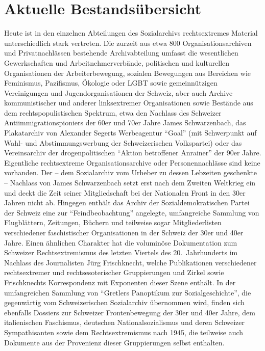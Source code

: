 \documentclass[a4paper,
fontsize=11pt,
oneside,
numbers=noperiodatend,
parskip=half-,
bibliography=totoc,
final
]{scrartcl}
\begin{document}
\hypertarget{aktuelle-bestandsuxfcbersicht}{%
\section*{Aktuelle
Bestandsübersicht}\label{aktuelle-bestandsuxfcbersicht}}

Heute ist in den einzelnen Abteilungen des Sozialarchivs rechtsextremes
Material unterschiedlich stark vertreten. Die zurzeit aus etwa 800
Organisationsarchiven und Privatnachlässen bestehende Archivabteilung
umfasst die wesentlichen Gewerkschaften und Arbeitnehmerverbände,
politischen und kulturellen Organisationen der Arbeiterbewegung,
sozialen Bewegungen aus Bereichen wie Feminismus, Pazifismus, Ökologie
oder LGBT sowie gemeinnützigen Vereinigungen und Jugendorganisationen
der Schweiz, aber auch Archive kommunistischer und anderer linksextremer
Organisationen sowie Bestände aus dem rechtspopulistischen Spektrum,
etwa den Nachlass des Schweizer Antiimmigrationspioniers der 60er und
70er Jahre James Schwarzenbach, das Plakatarchiv von Alexander Segerts
Werbeagentur \enquote{Goal} (mit Schwerpunkt auf Wahl- und
Abstimmungswerbung der Schweizerischen Volkspartei) oder das
Vereinsarchiv der drogenpolitischen \enquote{Aktion betroffener
Anrainer} der 90er Jahre. Eigentliche rechtsextreme Organisationsarchive
oder Personennachlässe sind keine vorhanden. Der -- dem Sozialarchiv vom
Urheber zu dessen Lebzeiten geschenkte -- Nachlass von James
Schwarzenbach setzt erst nach dem Zweiten Weltkrieg ein und deckt die
Zeit seiner Mitgliedschaft bei der Nationalen Front in den 30er Jahren
nicht ab. Hingegen enthält das Archiv der Sozialdemokratischen Partei
der Schweiz eine zur \enquote{Feindbeobachtung} angelegte, umfangreiche
Sammlung von Flugblättern, Zeitungen, Büchern und teilweise sogar
Mitgliederlisten verschiedener faschistischer Organisationen in der
Schweiz der 30er und 40er Jahre. Einen ähnlichen Charakter hat die
voluminöse Dokumentation zum Schweizer Rechtsextremismus des letzten
Viertels des 20.~Jahrhunderts im Nachlass des Journalisten Jürg
Frischknecht, welche Publikationen verschiedener rechtsextremer und
rechtsesoterischer Gruppierungen und Zirkel sowie Frischknechts
Korrespondenz mit Exponenten dieser Szene enthält. In der umfangreichen
Sammlung von \enquote{Gretlers Panoptikum zur Sozialgeschichte}, die
gegenwärtig vom Schweizerischen Sozialarchiv übernommen wird, finden
sich ebenfalls Dossiers zur Schweizer Frontenbewegung der 30er und 40er
Jahre, dem italienischen Faschismus, deutschen Nationalsozialismus und
deren Schweizer Sympathisanten sowie dem Rechtsextremismus nach 1945,
die teilweise auch Dokumente aus der Provenienz dieser Gruppierungen
selbst enthalten.
\end{document}
